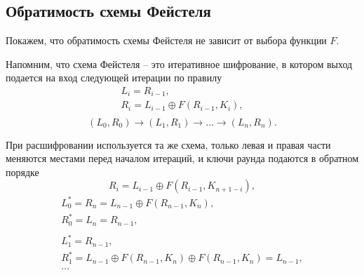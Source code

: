 \subsection{Обратимость схемы Фейстеля}

Покажем, что обратимость схемы Фейстеля не зависит от выбора функции $F$.

Напомним, что схема Фейстеля -- это итеративное шифрование, в котором выход подается на вход следующей итерации по правилу
\[ \begin{array}{l}
    L_i = R_{i-1}, \\
    R_i = L_{i-1} \oplus F(R_{i-1}, K_i), \\
\end{array} \]
\[
    (L_0,R_0) \rightarrow (L_1,R_1) \rightarrow \ldots \rightarrow (L_n,R_n).
\]

При расшифровании используется та же схема, только левая и правая части меняются местами перед началом итераций, и ключи раунда подаются в обратном порядке
    \[ R_i = L_{i-1} \oplus F(R_{i-1}, K_{n+1-i}), \]
\[ \begin{array}{l}
    L_0^* = R_n = L_{n-1} \oplus F(R_{n-1}, K_n), \\
    R_0^* = L_n = R_{n-1}, \\
    \\
    L_1^* = R_{n-1}, \\
    R_1^* = L_{n-1} \oplus F(R_{n-1}, K_n) \oplus F(R_{n-1}, K_n) = L_{n-1}, \\
    \dots
\end{array} \]
